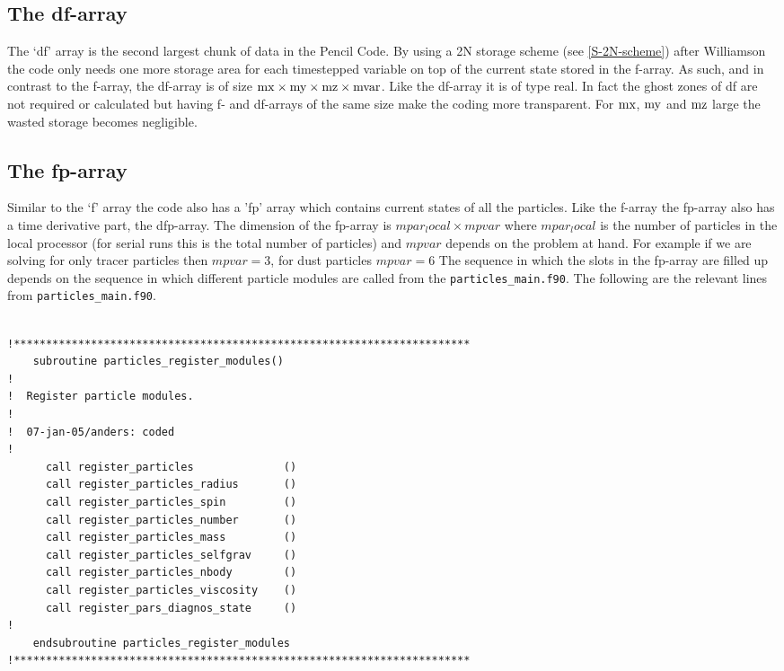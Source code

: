 \documentclass[\mydriver,12pt,twoside,notitlepage,a4paper]{article}
\newcommand{\code}[1]{\texttt{#1}}
\begin{document}
\subsection{The df-array}
\label{df-array}
The `df' array is the second largest chunk of data in the {\sc Pencil Code}.
By using a 2N storage scheme (see \ref{S-2N-scheme}) after
Williamson \cite{2Nstorage} the code only needs one more storage
area for each timestepped variable on top of the current state stored in
the f-array.  As such, and in contrast to the f-array, the df-array is of size
$\rm{mx}\times\rm{my}\times\rm{mz}\times\rm{mvar}$.  Like the df-array it is
of type real.  In fact the ghost zones
of df are not required or calculated but having f- and df-arrays of the same
size make the coding more transparent.  For $\rm{mx}$, $\rm{my}$ and
$\rm{mz}$ large the wasted storage becomes negligible.

%
\subsection{The fp-array}
\label{fp-array}

Similar to the `f' array the code also has a 'fp' array which contains current
states of all the particles. Like the f-array the fp-array also has a time
derivative part, the dfp-array. The dimension of the fp-array is
$mpar_local\times mpvar$ where $mpar_local$ is the number of particles in the
local processor (for serial runs this is the total number of particles) and
$mpvar$ depends on the problem at hand. For example if we are solving for only
tracer particles then $mpvar=3$, for dust particles $mpvar=6$  The sequence in
which the slots in the fp-array are filled up depends on the sequence in which
different particle modules are called from the \code{particles_main.f90}. The
following are the relevant lines from \code{particles_main.f90}.
\begin{verbatim}

!***********************************************************************
    subroutine particles_register_modules()
!
!  Register particle modules.
!
!  07-jan-05/anders: coded
!
      call register_particles              ()
      call register_particles_radius       ()
      call register_particles_spin         ()
      call register_particles_number       ()
      call register_particles_mass         ()
      call register_particles_selfgrav     ()
      call register_particles_nbody        ()
      call register_particles_viscosity    ()
      call register_pars_diagnos_state     ()
!
    endsubroutine particles_register_modules
!***********************************************************************
\end{verbatim}
\end{document}
